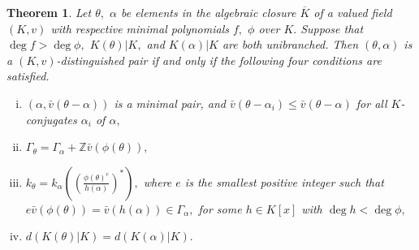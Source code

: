 \documentclass[11pt]{amsart}
\newtheorem{theorem}{Theorem}[section]
\theoremstyle{definition}
\theoremstyle{remark}
\numberwithin{equation}{section}
\begin{document}
	\begin{theorem}\label{dpmt}
	Let $\theta,$ $\alpha$ be elements in the algebraic  closure $\overline{K}$ of a valued field $(K,v)$ with respective minimal polynomials $f,$ $\phi$ over $K.$ Suppose that $\deg f>\deg \phi,$ $K(\theta)|K,$ and $K(\alpha)|K$ are both unibranched. Then $(\theta,\alpha)$ is a $(K,v)$-distinguished pair if and only if the following four conditions are satisfied.
	\begin{enumerate}[(i)]
		\item $(\alpha,\bar{v}(\theta-\alpha))$ is a minimal pair, and $\bar{v}(\theta-\alpha_i)\leq\bar{v}(\theta-\alpha)$ for all $K$-conjugates $\alpha_i$ of $\alpha,$
	
		\item $\Gamma_\theta=\Gamma_\alpha+\mathbb{Z}\bar{v}(\phi(\theta)),$
		\item $k_\theta=k_\alpha\left(\left(\frac{\phi(\theta)^e}{h(\alpha)}\right)^*\right),$ where $e$ is the smallest positive integer such that $e\bar{v}(\phi(\theta))=\bar{v}(h(\alpha))\in \Gamma_\alpha,$ for some $h\in K[x]$ with $\deg h<\deg \phi,$
			\item $d(K(\theta)|K)=d(K(\alpha)|K).$
	\end{enumerate}
	\end{theorem}
\end{document}
